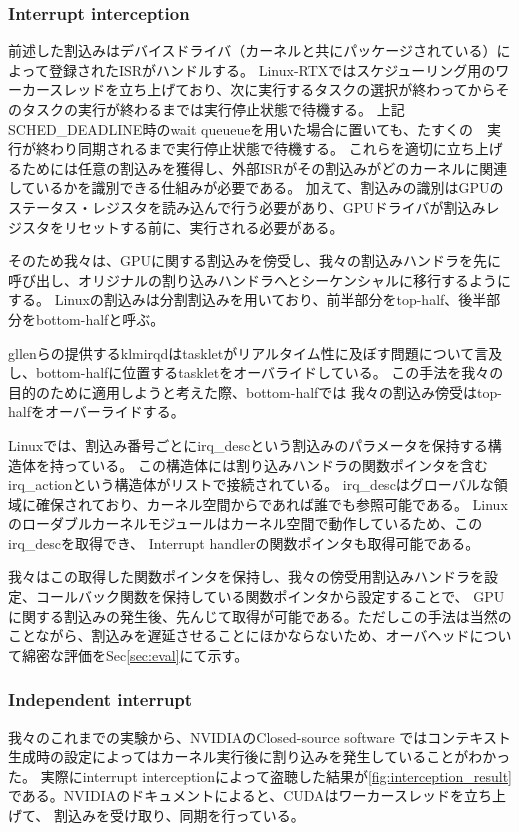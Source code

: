 \subsubsection{Interrupt interception}
前述した割込みはデバイスドライバ（カーネルと共にパッケージされている）によって登録されたISRがハンドルする。
Linux-RTXではスケジューリング用のワーカースレッドを立ち上げており、次に実行するタスクの選択が終わってからそのタスクの実行が終わるまでは実行停止状態で待機する。
上記SCHED\_DEADLINE時のwait queueueを用いた場合に置いても、たすくの　実行が終わり同期されるまで実行停止状態で待機する。
これらを適切に立ち上げるためには任意の割込みを獲得し、外部ISRがその割込みがどのカーネルに関連しているかを識別できる仕組みが必要である。
加えて、割込みの識別はGPUのステータス・レジスタを読み込んで行う必要があり、GPUドライバが割込みレジスタをリセットする前に、実行される必要がある。

そのため我々は、GPUに関する割込みを傍受し、我々の割込みハンドラを先に呼び出し、オリジナルの割り込みハンドラへとシーケンシャルに移行するようにする。
Linuxの割込みは分割割込みを用いており、前半部分をtop-half、後半部分をbottom-halfと呼ぶ。

gllenらの提供するklmirqdはtaskletがリアルタイム性に及ぼす問題について言及し、bottom-halfに位置するtaskletをオーバライドしている。
この手法を我々の目的のために適用しようと考えた際、bottom-halfでは
我々の割込み傍受はtop-halfをオーバーライドする。

Linuxでは、割込み番号ごとにirq\_descという割込みのパラメータを保持する構造体を持っている。
この構造体には割り込みハンドラの関数ポインタを含むirq\_actionという構造体がリストで接続されている。
irq\_descはグローバルな領域に確保されており、カーネル空間からであれば誰でも参照可能である。
Linuxのローダブルカーネルモジュールはカーネル空間で動作しているため、このirq\_descを取得でき、
Interrupt handlerの関数ポインタも取得可能である。

我々はこの取得した関数ポインタを保持し、我々の傍受用割込みハンドラを設定、コールバック関数を保持している関数ポインタから設定することで、
GPUに関する割込みの発生後、先んじて取得が可能である。ただしこの手法は当然のことながら、割込みを遅延させることにほかならないため、オーバヘッドについて綿密な評価をSec\ref{sec:eval}にて示す。

\subsubsection{Independent interrupt}
我々のこれまでの実験から、NVIDIAのClosed-source software ではコンテキスト生成時の設定によってはカーネル実行後に割り込みを発生していることがわかった。
実際にinterrupt interceptionによって盗聴した結果が\ref{fig:interception_result}である。NVIDIAのドキュメントによると、CUDAはワーカースレッドを立ち上げて、
割込みを受け取り、同期を行っている。

